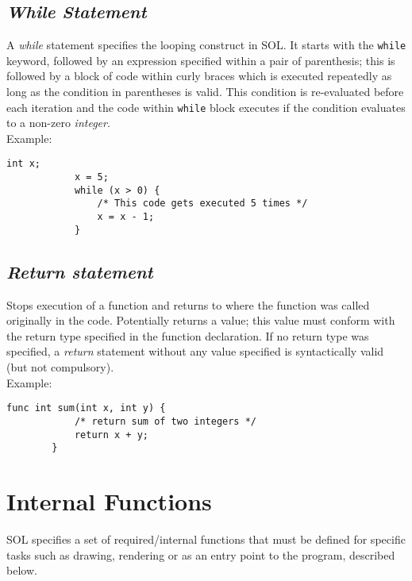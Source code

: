     \subsection{\textit{While Statement}}
    A \textit{while} statement specifies the looping construct in SOL. It starts with the \texttt{while} keyword, followed by an expression specified within a pair of parenthesis; this is followed by a block of code within curly braces which is executed repeatedly as long as the condition in parentheses is valid. This condition is re-evaluated before each iteration and the code within \texttt{while} block executes if the condition evaluates to a non-zero \textit{integer}. \\
    Example:\\
    \begin{lstlisting}[style=sol]
            int x;
            x = 5;
            while (x > 0) {
                /* This code gets executed 5 times */
                x = x - 1;
            }
        \end{lstlisting}

    \subsection{\textit{Return statement}}
    Stops execution of a function and returns to where the function was called originally in the code. Potentially returns a value; this value must conform with the return type specified in the function declaration. If no return type was specified, a \textit{return} statement without any value specified is syntactically valid (but not compulsory).\\
    Example:\\
    \begin{lstlisting}[style=sol]
        func int sum(int x, int y) {
            /* return sum of two integers */
            return x + y;
        }
    \end{lstlisting}
    
\section{Internal Functions} \label{internal}
SOL specifies a set of required/internal functions that must be defined for specific tasks such as drawing, rendering or as an entry point to the program, described below.

